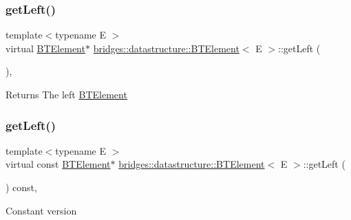 \subsubsection{\texorpdfstring{get\+Left()}{getLeft()}\hspace{0.1cm}{\footnotesize\ttfamily [1/2]}}
{\footnotesize\ttfamily template$<$typename E $>$ \\
virtual \mbox{\hyperlink{classbridges_1_1datastructure_1_1_b_t_element}{B\+T\+Element}}$\ast$ \mbox{\hyperlink{classbridges_1_1datastructure_1_1_b_t_element}{bridges\+::datastructure\+::\+B\+T\+Element}}$<$ E $>$\+::get\+Left (\begin{DoxyParamCaption}{ }\end{DoxyParamCaption})\hspace{0.3cm}{\ttfamily [inline]}, {\ttfamily [virtual]}}

\begin{DoxyReturn}{Returns}
The left \mbox{\hyperlink{classbridges_1_1datastructure_1_1_b_t_element}{B\+T\+Element}} 
\end{DoxyReturn}
\mbox{\label{classbridges_1_1datastructure_1_1_b_t_element_aa13df422de48c6297223c3c28caf9277}} 
\subsubsection{\texorpdfstring{get\+Left()}{getLeft()}\hspace{0.1cm}{\footnotesize\ttfamily [2/2]}}
{\footnotesize\ttfamily template$<$typename E $>$ \\
virtual const \mbox{\hyperlink{classbridges_1_1datastructure_1_1_b_t_element}{B\+T\+Element}}$\ast$ \mbox{\hyperlink{classbridges_1_1datastructure_1_1_b_t_element}{bridges\+::datastructure\+::\+B\+T\+Element}}$<$ E $>$\+::get\+Left (\begin{DoxyParamCaption}{ }\end{DoxyParamCaption}) const\hspace{0.3cm}{\ttfamily [inline]}, {\ttfamily [virtual]}}

Constant version \mbox{\label{classbridges_1_1datastructure_1_1_b_t_element_a3f73fcc5a7ed1af1a628803879682f80}} 
